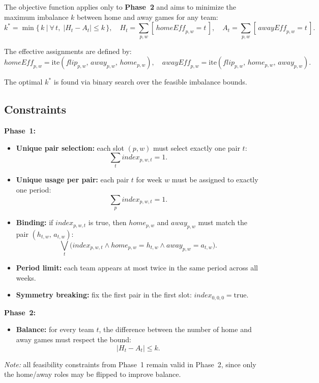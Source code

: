 The objective function applies only to \textbf{Phase~2} and aims to minimize the maximum imbalance $k$ between home and away games for any team:
\[
k^* = \min \Big\{\, k ~\Big|~ \forall\, t,\; |H_t - A_t| \leq k\, \Big\},
\quad H_t = \sum_{p,w} [\,\mathit{homeEff}_{p,w} = t\,], \quad
A_t = \sum_{p,w} [\,\mathit{awayEff}_{p,w} = t\,].
\]

The effective assignments are defined by:
\[
\mathit{homeEff}_{p,w} = \text{ite}(\mathit{flip}_{p,w},\, \mathit{away}_{p,w},\, \mathit{home}_{p,w}), \quad
\mathit{awayEff}_{p,w} = \text{ite}(\mathit{flip}_{p,w},\, \mathit{home}_{p,w},\, \mathit{away}_{p,w}).
\]

The optimal $k^*$ is found via binary search over the feasible imbalance bounds.

\subsection{Constraints}

\textbf{Phase~1:}
\begin{itemize}
    \item \textbf{Unique pair selection:} each slot $(p,w)$ must select exactly one pair $t$:
    \[
    \sum_{t} \mathit{index}_{p,w,t} = 1.
    \]
    \item \textbf{Unique usage per pair:} each pair $t$ for week $w$ must be assigned to exactly one period:
    \[
    \sum_{p} \mathit{index}_{p,w,t} = 1.
    \]
    \item \textbf{Binding:} if $\mathit{index}_{p,w,t}$ is true, then $\mathit{home}_{p,w}$ and $\mathit{away}_{p,w}$ must match the pair $(h_{t,w},\, a_{t,w})$:
    \[
    \bigvee_{t} \Big(
      \mathit{index}_{p,w,t} \wedge 
      \mathit{home}_{p,w} = h_{t,w} \wedge 
      \mathit{away}_{p,w} = a_{t,w}
    \Big).
    \]
    \item \textbf{Period limit:} each team appears at most twice in the same period across all weeks.
    \item \textbf{Symmetry breaking:} fix the first pair in the first slot: $\mathit{index}_{0,0,0} = \text{true}$.
\end{itemize}

\textbf{Phase~2:}
\begin{itemize}
    \item \textbf{Balance:} for every team $t$, the difference between the number of home and away games must respect the bound:
    \[
    |H_t - A_t| \leq k.
    \]
\end{itemize}
\textit{Note:} all feasibility constraints from Phase~1 remain valid in Phase~2, since only the home/away roles may be flipped to improve balance.

